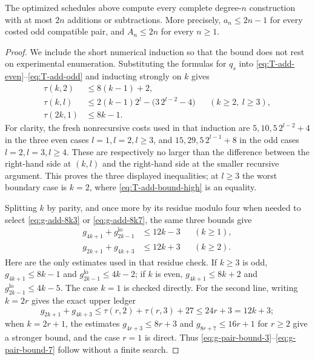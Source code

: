 \begin{theorem}
\label{thm:construction-addition-count}
The optimized schedules above compute every complete degree-$n$
construction with at most $2n$ additions or subtractions.  More precisely,
$a_n\le2n-1$ for every costed odd compatible pair, and $A_n\le2n$ for
every $n\ge1$.
\end{theorem}
\begin{proof}
We include the short numerical induction so that the bound does not rest on
experimental enumeration.  Substituting the formulas for $q_s$ into
\eqref{eq:T-add-even}--\eqref{eq:T-add-odd} and inducting strongly on $k$
gives
\begin{align}
 \tau(k,2)&\le8(k-1)+2,\label{eq:T-add-bound-2}\\
 \tau(k,l)&\le2(k-1)2^l-\bigl(3\,2^{l-2}-4\bigr)
       &&(k\ge2,\ l\ge3),\label{eq:T-add-bound-high}\\
 \tau(2k,1)&\le8k-1.\label{eq:T-add-bound-1}
\end{align}
For clarity, the fresh nonrecursive costs used in that induction are
$5,10,5\,2^{l-2}+4$ in the three even cases
$l=1,l=2,l\ge3$, and $15,29,5\,2^{l-1}+8$ in the odd cases
$l=2,l=3,l\ge4$.  These are respectively no larger than the difference
between the right-hand side at $(k,l)$ and the right-hand side at the
smaller recursive argument.  This proves the three displayed inequalities;
at $l\ge3$ the worst boundary case is $k=2$, where
\eqref{eq:T-add-bound-high} is an equality.

Splitting $k$ by parity, and once more by its residue modulo four when
needed to select \eqref{eq:g-add-8k3} or \eqref{eq:g-add-8k7}, the same
three bounds give
\begin{align}
 g_{4k+1}+g^{\mathrm{lo}}_{2k-1}&\le12k-3 &&(k\ge1),
 \label{eq:g-pair-bound-3}\\
 g_{2k+1}+g_{4k+3}&\le12k+3 &&(k\ge2).
 \label{eq:g-pair-bound-7}
\end{align}
Here are the only estimates used in that residue check.  If $k\ge3$ is odd,
$g_{4k+1}\le8k-1$ and
$g^{\mathrm{lo}}_{2k-1}\le4k-2$; if $k$ is even,
$g_{4k+1}\le8k+2$ and
$g^{\mathrm{lo}}_{2k-1}\le4k-5$.  The case $k=1$ is checked directly.
For the second line, writing $k=2r$ gives the exact upper ledger
\[
 g_{2k+1}+g_{4k+3}
 \le \tau(r,2)+\tau(r,3)+27\le24r+3=12k+3;
\]
when $k=2r+1$, the estimates
$g_{4r+3}\le8r+3$ and
$g_{8r+7}\le16r+1$ for $r\ge2$ give a stronger bound, and the case $r=1$
is direct.  Thus \eqref{eq:g-pair-bound-3}--\eqref{eq:g-pair-bound-7}
follow without a finite search.


\end{proof}

